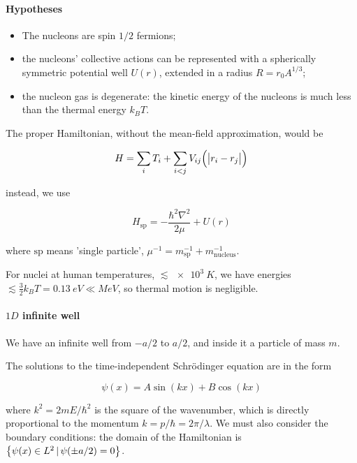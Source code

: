 \documentclass{article}
\begin{document}
\paragraph{Hypotheses}

\begin{itemize}
    \item The nucleons are spin \(1/2\) fermions;
    \item the nucleons' collective actions can be represented with a spherically symmetric potential well \(U(r)\), extended in a radius \(R = r_0 A^{1/3}\);
    \item the nucleon gas is degenerate: the kinetic energy of the nucleons is much less than the thermal energy \(k_B T\).
\end{itemize}

The proper Hamiltonian, without the mean-field approximation,  would be

\begin{equation}
    H = \sum _{i} T_i + \sum _{i<j} V_{ij} \qty(\abs{r_i - r_j} )
\end{equation}

instead, we use

\begin{equation}
    H_{\text{sp}} = -\frac{\hbar^2 \nabla^2}{2 \mu} + U(r)
\end{equation}

where \(\text{sp}\) means 'single particle', \(\mu ^{-1} = m _{\text{sp}} ^{-1} + m _{\text{nucleus}} ^{-1}\).

For nuclei at human temperatures, \(\lesssim \SI{e3}{K} \), we have energies \(\lesssim \frac{3}{2} k_B T = \SI{0.13}{eV}  \ll MeV \), so thermal motion is negligible.

\paragraph{\(1D\) infinite well}

We have an infinite well from \(-a/2\) to \(a/2\), and inside it a particle of mass \(m\).

The solutions to the time-independent Schrödinger equation are in the form

\begin{equation}
    \psi(x) = A \sin(kx) +B \cos(kx)
\end{equation}

where \(k^2  = 2mE / \hbar^2\) is the square of the wavenumber, which is directly proportional to the momentum \(k = p/\hbar = 2 \pi / \lambda\). We must also consider the boundary conditions: the domain of the Hamiltonian is \(\qty{\psi(x) \in L^2 \,|\, \psi(\pm a/2)=0 } \).
\end{document}
